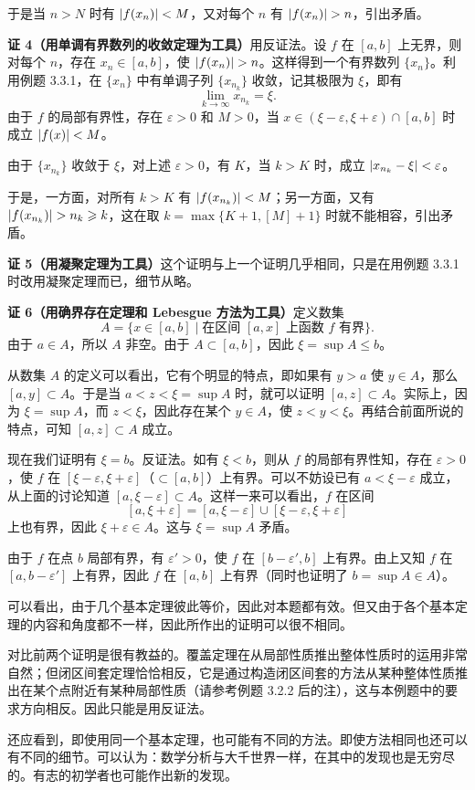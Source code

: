 \begin{xproof}
于是当 $n>N$ 时有 $\lvert f(x_n)\rvert<M$，又对每个 $n$ 有 $\lvert f(x_n)\rvert>n$，引出矛盾。

\textbf{证 4（用单调有界数列的收敛定理为工具）}\quad 用反证法。设 $f$ 在 $[a,b]$ 上无界，则对每个 $n$，存在 $x_n\in[a,b]$，使 $\lvert f(x_n)\rvert>n$。这样得到一个有界数列 $\{x_n\}$。利用例题 3.3.1，在 $\{x_n\}$ 中有单调子列 $\{x_{n_k}\}$ 收敛，记其极限为 $\xi$，即有
\[
  \lim_{k\to\infty}x_{n_k}=\xi.
\]
由于 $f$ 的局部有界性，存在 $\varepsilon>0$ 和 $M>0$，当 $x\in(\xi-\varepsilon,\xi+\varepsilon)\cap[a,b]$ 时成立 $\lvert f(x)\rvert<M$。

由于 $\{x_{n_k}\}$ 收敛于 $\xi$，对上述 $\varepsilon>0$，有 $K$，当 $k>K$ 时，成立 $\lvert x_{n_k}-\xi\rvert<\varepsilon$。

于是，一方面，对所有 $k>K$ 有 $\lvert f(x_{n_k})\rvert<M$；另一方面，又有 $\lvert f(x_{n_k})\rvert>n_k\geqslant k$，这在取 $k=\max\{K+1,[M]+1\}$ 时就不能相容，引出矛盾。

\textbf{证 5（用凝聚定理为工具）}\quad 这个证明与上一个证明几乎相同，只是在用例题 3.3.1 时改用凝聚定理而已，细节从略。

\textbf{证 6（用确界存在定理和 Lebesgue 方法为工具）}\quad 定义数集
\[
  A=\{x\in[a,b]\mid \text{在区间 }[a,x]\text{ 上函数 }f\text{ 有界}\}.
\]
由于 $a\in A$，所以 $A$ 非空。由于 $A\subset[a,b]$，因此 $\xi=\sup A\leqslant b$。

从数集 $A$ 的定义可以看出，它有个明显的特点，即如果有 $y>a$ 使 $y\in A$，那么 $[a,y]\subset A$。于是当 $a<z<\xi=\sup A$ 时，就可以证明 $[a,z]\subset A$。实际上，因为 $\xi=\sup A$，而 $z<\xi$，因此存在某个 $y\in A$，使 $z<y<\xi$。再结合前面所说的特点，可知 $[a,z]\subset A$ 成立。

现在我们证明有 $\xi=b$。反证法。如有 $\xi<b$，则从 $f$ 的局部有界性知，存在 $\varepsilon>0$，使 $f$ 在 $[\xi-\varepsilon,\xi+\varepsilon]$（$\subset[a,b]$）上有界。可以不妨设已有 $a<\xi-\varepsilon$ 成立，从上面的讨论知道 $[a,\xi-\varepsilon]\subset A$。这样一来可以看出，$f$ 在区间
\[
  [a,\xi+\varepsilon]=[a,\xi-\varepsilon]\cup[\xi-\varepsilon,\xi+\varepsilon]
\]
上也有界，因此 $\xi+\varepsilon\in A$。这与 $\xi=\sup A$ 矛盾。

由于 $f$ 在点 $b$ 局部有界，有 $\varepsilon'>0$，使 $f$ 在 $[b-\varepsilon',b]$ 上有界。由上又知 $f$ 在 $[a,b-\varepsilon']$ 上有界，因此 $f$ 在 $[a,b]$ 上有界（同时也证明了 $b=\sup A\in A$）。
\end{xproof}

\begin{xremark}
可以看出，由于几个基本定理彼此等价，因此对本题都有效。但又由于各个基本定理的内容和角度都不一样，因此所作出的证明可以很不相同。

对比前两个证明是很有教益的。覆盖定理在从局部性质推出整体性质时的运用非常自然；但闭区间套定理恰恰相反，它是通过构造闭区间套的方法从某种整体性质推出在某个点附近有某种局部性质（请参考例题 3.2.2 后的注），这与本例题中的要求方向相反。因此只能是用反证法。

还应看到，即使用同一个基本定理，也可能有不同的方法。即使方法相同也还可以有不同的细节。可以认为：数学分析与大千世界一样，在其中的发现也是无穷尽的。有志的初学者也可能作出新的发现。
\end{xremark}

